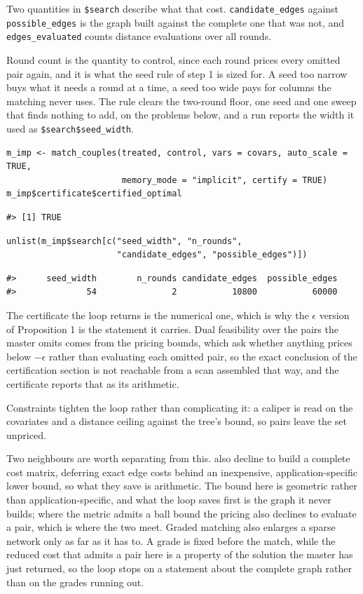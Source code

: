 Two quantities in \texttt{\$search} describe what that cost. \texttt{candidate\_edges} against
\texttt{possible\_edges} is the graph built against the complete one that was not, and
\texttt{edges\_evaluated} counts distance evaluations over all rounds.

Round count is the quantity to control, since each round prices every omitted
pair again, and it is what the seed rule of step 1 is sized for. A seed too narrow buys what it needs a round at a time, a seed too wide pays for columns
the matching never uses. The rule clears the two-round floor, one seed and one
sweep that finds nothing to add, on the problems below, and a run reports the
width it used as \texttt{\$search\$seed\_width}.

\begin{verbatim}
m_imp <- match_couples(treated, control, vars = covars, auto_scale = TRUE,
                       memory_mode = "implicit", certify = TRUE)
m_imp$certificate$certified_optimal
\end{verbatim}

\begin{verbatim}
#> [1] TRUE
\end{verbatim}

\begin{verbatim}
unlist(m_imp$search[c("seed_width", "n_rounds",
                      "candidate_edges", "possible_edges")])
\end{verbatim}

\begin{verbatim}
#>      seed_width        n_rounds candidate_edges  possible_edges 
#>              54               2           10800           60000
\end{verbatim}

The certificate the loop returns is the numerical one, which is why the
\(\epsilon\) version of Proposition 1 is the statement it carries. Dual
feasibility over the pairs the master omits comes from the pricing bounds, which
ask whether anything prices below \(-\epsilon\) rather than evaluating each
omitted pair, so the exact conclusion of the certification section is not
reachable from a scan assembled that way, and the certificate reports that as
its arithmetic.

Constraints tighten the loop rather than complicating it: a caliper is read on
the covariates and a distance ceiling against the tree's bound, so pairs
leave the set unpriced.

Two neighbours are worth separating from this. \citet{Abeywickrama2021} also decline
to build a complete cost matrix, deferring exact edge costs behind an
inexpensive, application-specific lower bound, so what they save is
arithmetic. The bound here is geometric rather than application-specific, and
what the loop saves first is the graph it never builds; where the metric
admits a ball bound the pricing also declines to evaluate a pair, which is
where the two meet. Graded matching \citep{YuRosenbaum2022} also enlarges a sparse network
only as far as it has to. A grade is fixed before the match, while the
reduced cost that admits a pair here is a property of the solution the master
has just returned, so the loop stops on a statement about the complete graph
rather than on the grades running out.

